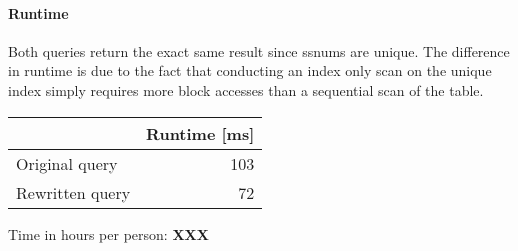 \documentclass[11pt]{scrartcl}
\begin{document}
\paragraph{Runtime}
Both queries return the exact same result since ssnums are unique. The difference in runtime is due to the fact that conducting an index only scan on the unique index simply requires more block accesses than a sequential scan of the table.

\begin{table}[H]
  \begin{tabular}{l|r}
    & Runtime [ms] \\
   \hline
    Original query & 103 \\
    Rewritten query & 72 \\
  \end{tabular}
\end{table}


  Time in hours per person: {\textbf{XXX}}
\end{document}
